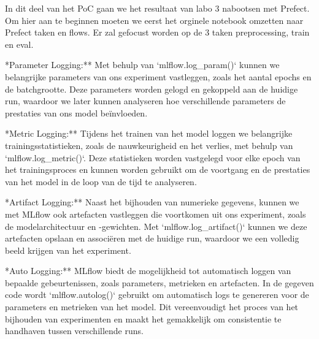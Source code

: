 In dit deel van het PoC gaan we het resultaat van labo 3 nabootsen met Prefect.
Om hier aan te beginnen moeten we eerst het orginele notebook omzetten naar Prefect taken en flows. Er zal gefocust worden op de 3 taken preprocessing, train en eval.


\item **Parameter Logging:** Met behulp van `mlflow.log_param()` kunnen we belangrijke parameters van ons experiment vastleggen, zoals het aantal epochs en de batchgrootte. Deze parameters worden gelogd en gekoppeld aan de huidige run, waardoor we later kunnen analyseren hoe verschillende parameters de prestaties van ons model beïnvloeden.

\item **Metric Logging:** Tijdens het trainen van het model loggen we belangrijke trainingsstatistieken, zoals de nauwkeurigheid en het verlies, met behulp van `mlflow.log_metric()`. Deze statistieken worden vastgelegd voor elke epoch van het trainingsproces en kunnen worden gebruikt om de voortgang en de prestaties van het model in de loop van de tijd te analyseren.

\item **Artifact Logging:** Naast het bijhouden van numerieke gegevens, kunnen we met MLflow ook artefacten vastleggen die voortkomen uit ons experiment, zoals de modelarchitectuur en -gewichten. Met `mlflow.log_artifact()` kunnen we deze artefacten opslaan en associëren met de huidige run, waardoor we een volledig beeld krijgen van het experiment.

\item **Auto Logging:** MLflow biedt de mogelijkheid tot automatisch loggen van bepaalde gebeurtenissen, zoals parameters, metrieken en artefacten. In de gegeven code wordt `mlflow.autolog()` gebruikt om automatisch logs te genereren voor de parameters en metrieken van het model. Dit vereenvoudigt het proces van het bijhouden van experimenten en maakt het gemakkelijk om consistentie te handhaven tussen verschillende runs.

